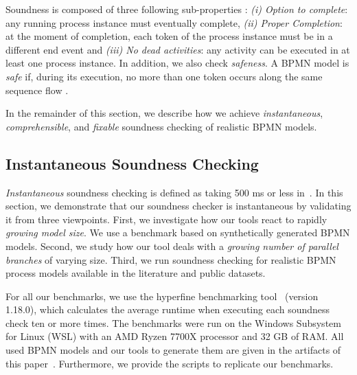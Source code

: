 \documentclass[runningheads]{llncs}
\begin{document}
Soundness is composed of three following sub-properties \cite{corradiniClassificationBPMNCollaborations2018}:
\textit{(i) Option to complete}: any running process instance must eventually complete,
\textit{(ii) Proper Completion}: at the moment of completion, each token of the process instance must be in a different end event and
\textit{(iii) No dead activities}: any activity can be executed in at least one process instance.
In addition, we also check \textit{safeness}.
A BPMN model is \textit{safe} if, during its execution, no more than one token occurs along the same sequence flow \cite{corradiniClassificationBPMNCollaborations2018}.

In the remainder of this section, we describe how we achieve \textit{instantaneous}, \textit{comprehensible}, and \textit{fixable} soundness checking of realistic BPMN models.


\subsection{Instantaneous Soundness Checking} \label{subsec:instantaneous}
\textit{Instantaneous} soundness checking is defined as taking 500 ms or less in~\cite{fahlandAnalysisDemandInstantaneous2011}.
In this section, we demonstrate that our soundness checker is instantaneous by validating it from three viewpoints.
First, we investigate how our tools react to rapidly \textit{growing model size}.
We use a benchmark based on synthetically generated BPMN models.
Second, we study how our tool deals with a \textit{growing number of parallel branches} of varying size.
Third, we run soundness checking for realistic BPMN process models available in the literature and public datasets.

For all our benchmarks, we use the hyperfine benchmarking tool~\cite{peterHyperfine2023} (version 1.18.0), which calculates the average runtime when executing each soundness check ten or more times.
The benchmarks were run on the Windows Subsystem for Linux (WSL) with an AMD Ryzen 7700X processor and 32 GB of RAM.
All used BPMN models and our tools to generate them are given in the artifacts of this paper~\cite{noauthorgivenBPM2024Artifacts2024}.
Furthermore, we provide the scripts to replicate our benchmarks.
\end{document}
